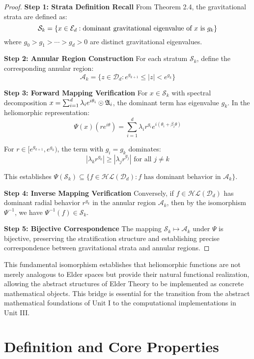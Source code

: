 \begin{proof}
\textbf{Step 1: Strata Definition Recall}
From Theorem 2.4, the gravitational strata are defined as:
$$\mathcal{S}_k = \{x \in \mathcal{E}_{d} : \text{dominant gravitational eigenvalue of } x \text{ is } g_k\}$$
where $g_0 > g_1 > \cdots > g_d > 0$ are distinct gravitational eigenvalues.

\textbf{Step 2: Annular Region Construction}
For each stratum $\mathcal{S}_k$, define the corresponding annular region:
$$\mathcal{A}_k = \{z \in \mathcal{D}_d : e^{g_{k+1}} \leq |z| < e^{g_k}\}$$

\textbf{Step 3: Forward Mapping Verification}
For $x \in \mathcal{S}_k$ with spectral decomposition $x = \sum_{i=1}^d \lambda_i e^{i\theta_i} \odot \mathfrak{A}_{i}$, the dominant term has eigenvalue $g_k$. In the heliomorphic representation:
$$\Psi(x)(re^{i\theta}) = \sum_{i=1}^d \lambda_i r^{g_i} e^{i(\theta_i + \beta_i \theta)}$$

For $r \in [e^{g_{k+1}}, e^{g_k})$, the term with $g_i = g_k$ dominates:
$$|\lambda_k r^{g_k}| \geq |\lambda_j r^{g_j}| \text{ for all } j \neq k$$

This establishes $\Psi(\mathcal{S}_k) \subseteq \{f \in \mathcal{HL}(\mathcal{D}_d) : f \text{ has dominant behavior in } \mathcal{A}_k\}$.

\textbf{Step 4: Inverse Mapping Verification}
Conversely, if $f \in \mathcal{HL}(\mathcal{D}_d)$ has dominant radial behavior $r^{g_k}$ in the annular region $\mathcal{A}_k$, then by the isomorphism $\Psi^{-1}$, we have $\Psi^{-1}(f) \in \mathcal{S}_k$.

\textbf{Step 5: Bijective Correspondence}
The mapping $\mathcal{S}_k \mapsto \mathcal{A}_k$ under $\Psi$ is bijective, preserving the stratification structure and establishing precise correspondence between gravitational strata and annular regions.
\end{proof}

This fundamental isomorphism establishes that heliomorphic functions are not merely analogous to Elder spaces but provide their natural functional realization, allowing the abstract structures of Elder Theory to be implemented as concrete mathematical objects. This bridge is essential for the transition from the abstract mathematical foundations of Unit I to the computational implementations in Unit III.

\section{Definition and Core Properties}

